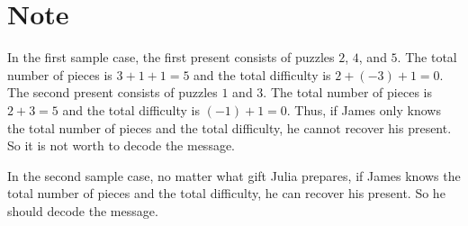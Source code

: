 \section*{Note}
In the first sample case, the first present consists of puzzles $2$, $4$, and $5$. The total number of pieces is $3 + 1 + 1 = 5$ and the total difficulty is $2 + (-3) + 1 = 0$. 
The second present consists of puzzles $1$ and $3$. The total number of pieces is $2 + 3 = 5$ and the total difficulty is $(-1) + 1 = 0$.
Thus, if James only knows the total number of pieces and the total difficulty, he cannot recover his present. So it is not worth to decode the message.

In the second sample case, no matter what gift Julia prepares, if James knows the total number of pieces and the total difficulty, he can recover his present. So he should decode the message.
